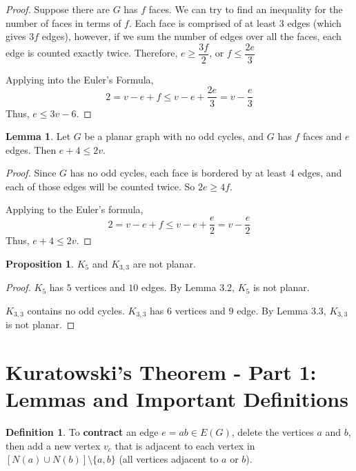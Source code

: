 \documentclass[12pt]{article}
\theoremstyle{definition}
\newtheorem{defn}{Definition}[section]
\newtheorem{prop}{Proposition}[section]
\newtheorem{lem}{Lemma}[section]
\begin{document}
\begin{proof}
    Suppose there are $G$ has $f$ faces. We can try to find an inequality for the number of faces in terms of $f$. Each face is comprised of at least 3 edges (which gives $3f$ edges), however, if we sum the number of edges over all the faces, each edge is counted exactly twice. Therefore, $e \geq \dfrac{3f}{2}$, or $f \leq \dfrac{2e}{3}$

    Applying into the Euler's Formula, $$2 = v-e+f \le v-e+\frac{2e}{3} = v - \frac{e}{3}$$ Thus, $e \le 3v-6$.
\end{proof}

\begin{greenbox}
\begin{lem}
    Let $G$ be a planar graph with no odd cycles, and $G$ has $f$ faces and $e$ edges. Then $e + 4 \le 2v$.
\end{lem}
\end{greenbox}

\begin{proof}
    Since $G$ has no odd cycles, each face is bordered by at least $4$ edges, and each of those edges will be counted twice. So $2e \geq 4f$.

    Applying to the Euler's formula, $$2 = v-e+f \le v -e+\frac{e}{2} = v-\frac{e}{2}$$ Thus, $e+4 \le 2v$.
\end{proof}

\begin{greenbox}

\begin{prop}
    $K_5$ and $K_{3,3}$ are not planar.
\end{prop}
\end{greenbox}

\begin{proof}

    $K_ 5$ has $5$ vertices and $10$ edges. By Lemma $3.2$, $K_5$ is not planar.

    $K_{3,3}$ contains no odd cycles. $K_{3,3}$ has $6$ vertices and $9$ edge. By Lemma $3.3$, $K_{3,3}$ is not planar.

\end{proof}

\section{Kuratowski's Theorem - Part 1: Lemmas and Important Definitions}
    \begin{bluebox}
        \begin{defn}
            To \textbf{contract }an edge $e = ab \in E(G)$, delete the vertices $a$ and $b$, then add a new vertex $v_c$ that is adjacent to each vertex in $[N(a) \cup N(b)] \setminus \{a,b\}$ (all vertices adjacent to $a$ or $b$).
        \end{defn}
    \end{bluebox}
\end{document}
